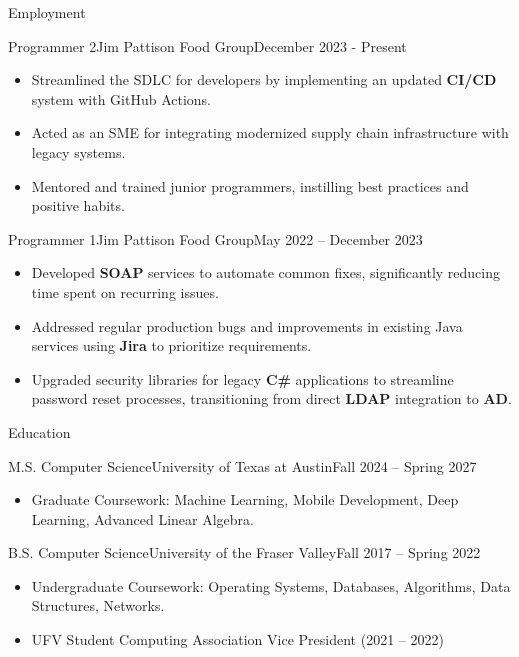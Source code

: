 \documentclass[]{mcdowellcv}
\begin{document}
	\makeheader
	
	\begin{cvsection}{Employment}
		\begin{cvsubsection}{Programmer 2}{Jim Pattison Food Group}{December 2023 - Present}		
			\begin{itemize}
				\item Streamlined the SDLC for developers by implementing an updated \textbf{CI/CD} system with GitHub Actions.
				\item Acted as an SME for integrating modernized supply chain infrastructure with legacy systems.
				\item Mentored and trained junior programmers, instilling best practices and positive habits.

			\end{itemize}
		\end{cvsubsection}
		
		\begin{cvsubsection}{Programmer 1}{Jim Pattison Food Group}{May 2022 -- December 2023}	
			\begin{itemize}
				\item Developed \textbf{SOAP} services to automate common fixes, significantly reducing time spent on recurring issues.
				\item Addressed regular production bugs and improvements in existing Java services using \textbf{Jira} to prioritize requirements.
				\item Upgraded security libraries for legacy \textbf{C\#} applications to streamline password reset processes, transitioning from direct \textbf{LDAP} integration to \textbf{AD}.
			\end{itemize}
		\end{cvsubsection}
	\end{cvsection}
	
	\begin{cvsection}{Education}
		\begin{cvsubsection}{M.S. Computer Science}{University of Texas at Austin}{Fall 2024 -- Spring 2027}
			\begin{itemize}
				\item Graduate Coursework: Machine Learning, Mobile Development, Deep Learning, Advanced Linear Algebra.
			\end{itemize}
		\end{cvsubsection}
		\begin{cvsubsection}{B.S. Computer Science}{University of the Fraser Valley}{Fall 2017 -- Spring 2022}
			\begin{itemize}
				\item Undergraduate Coursework: Operating Systems, Databases, Algorithms, Data Structures, Networks.
				\item UFV Student Computing Association Vice President (2021 – 2022)
			\end{itemize}
		\end{cvsubsection}
	\end{cvsection}
	
\end{document}
